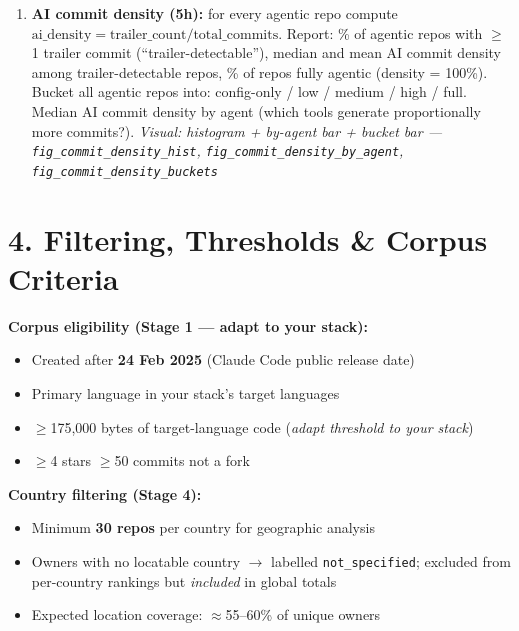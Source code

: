 \documentclass[9pt,a4paper]{article}
\begin{document}
\begin{enumerate}[leftmargin=1.5em,itemsep=1pt,topsep=2pt]
  \item \textbf{AI commit density (5h):} for every agentic repo compute
        $\text{ai\_density} = \text{trailer\_count} / \text{total\_commits}$.
        Report: \% of agentic repos with $\geq$1 trailer commit (``trailer-detectable''),
        median and mean AI commit density among trailer-detectable repos,
        \% of repos fully agentic (density = 100\%).
        Bucket all agentic repos into: config-only / low / medium / high / full.
        Median AI commit density by agent (which tools generate proportionally more commits?).
        \textit{Visual: histogram + by-agent bar + bucket bar ---
          \texttt{fig\_commit\_density\_hist}, \texttt{fig\_commit\_density\_by\_agent},
          \texttt{fig\_commit\_density\_buckets}}
\end{enumerate}

\section*{\textcolor{stageblue}{4. Filtering, Thresholds \& Corpus Criteria}}

\noindent\textbf{Corpus eligibility (Stage 1 --- adapt to your stack):}
\begin{itemize}[leftmargin=1.2em,itemsep=0pt,topsep=1pt]
  \item Created after \textbf{24 Feb 2025} (Claude Code public release date)
  \item Primary language in your stack's target languages
  \item $\geq$175,000 bytes of target-language code (\emph{adapt threshold to your stack})
  \item $\geq$4 stars \quad $\geq$50 commits \quad not a fork
\end{itemize}

\vspace{3pt}
\noindent\textbf{Country filtering (Stage 4):}
\begin{itemize}[leftmargin=1.2em,itemsep=0pt,topsep=1pt]
  \item Minimum \textbf{30 repos} per country for geographic analysis
  \item Owners with no locatable country $\to$ labelled \texttt{not\_specified}; excluded from
        per-country rankings but \emph{included} in global totals
  \item Expected location coverage: $\approx$55--60\% of unique owners
\end{itemize}
\end{document}

